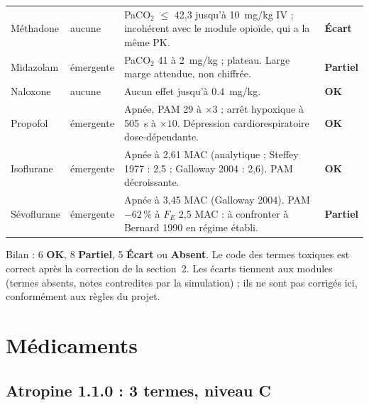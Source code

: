\documentclass[10pt,a4paper]{article}
\newcommand{\ok}{\textcolor{green!45!black}{\textbf{OK}}}
\newcommand{\ecart}{\textcolor{red!70!black}{\textbf{Écart}}}
\newcommand{\partiel}{\textcolor{orange!80!black}{\textbf{Partiel}}}
\newcommand{\absent}{\textcolor{red!70!black}{\textbf{Absent}}}
\begin{document}
\begin{longtable}{P{2.6cm}P{2.3cm}P{9.2cm}P{1.5cm}}
Méthadone & aucune & PaCO$_2$ $\leq$ 42,3 jusqu'à \SI{10}{mg/kg} IV ; incohérent avec le module opioïde, qui a la même PK. & \ecart\\
Midazolam & émergente & PaCO$_2$ 41 à \SI{2}{mg/kg} ; plateau. Large marge attendue, non chiffrée. & \partiel\\
Naloxone & aucune & Aucun effet jusqu'à \SI{0,4}{mg/kg}. & \ok\\
Propofol & émergente & Apnée, PAM 29 à $\times 3$ ; arrêt hypoxique à \SI{505}{s} à $\times 10$. Dépression cardiorespiratoire dose-dépendante. & \ok\\
Isoflurane & émergente & Apnée à 2,61 MAC (analytique ; Steffey 1977 : 2,5 ; Galloway 2004 : 2,6). PAM décroissante. & \ok\\
Sévoflurane & émergente & Apnée à 3,45 MAC (Galloway 2004). PAM $-62$\,\% à $F_E$ 2,5 MAC : à confronter à Bernard 1990 en régime établi. & \partiel\\
\bottomrule
\end{longtable}

Bilan : 6 \ok, 8 \partiel, 5 \ecart{} ou \absent. Le code des termes toxiques est correct après la correction de la section~2. Les écarts tiennent aux modules (termes absents, notes contredites par la simulation) ; ils ne sont pas corrigés ici, conformément aux règles du projet.

\section{Médicaments}

\subsection*{Atropine 1.1.0 : 3 termes, niveau C}
\end{document}
